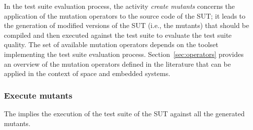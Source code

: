 










In the test suite evaluation process, the activity \emph{create mutants} concerns the application of the mutation operators to the source code of the SUT; it leads to the generation of modified versions of the SUT (i.e., the mutants) that should be compiled and then executed against the test suite to evaluate the test suite quality. 
The set of available mutation operators depends on the toolset implementing the test suite evaluation process.
Section~\ref{sec:operators} provides an overview of the mutation operators defined in the literature that can be applied in the context of space and embedded systems.

\subsubsection{Execute mutants}


The  implies the execution of the test suite of the SUT against all the generated mutants. 






